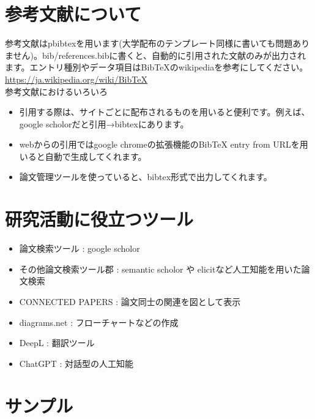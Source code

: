 \section{参考文献について}
参考文献はpbibtexを用います(大学配布のテンプレート同様に書いても問題ありません)。bib/references.bibに書くと、自動的に引用された文献のみが出力されます。エントリ種別やデータ項目はBibTeXのwikipedia\cite{BibTeXWi33:online}を参考にしてください。\\
\url{https://ja.wikipedia.org/wiki/BibTeX}\\
参考文献におけるいろいろ
\begin{itemize}
  \item 引用する際は、サイトごとに配布されるものを用いると便利です。例えば、google scholor\cite{GoogleSc43:online}だと引用→bibtexにあります。
  \item webからの引用ではgoogle chromeの拡張機能のBibTeX entry from URLを用いると自動で生成してくれます。
  \item 論文管理ツールを使っていると、bibtex形式で出力してくれます。
\end{itemize}

\section{研究活動に役立つツール}
\begin{itemize}
  \item 論文検索ツール : google scholor
  \item その他論文検索ツール郡 : semantic scholor や elicitなど人工知能を用いた論文検索
  \item CONNECTED PAPERS : 論文同士の関連を図として表示
  \item diagrams.net : フローチャートなどの作成
  \item DeepL : 翻訳ツール
  \item ChatGPT : 対話型の人工知能
\end{itemize}

\section{サンプル}
